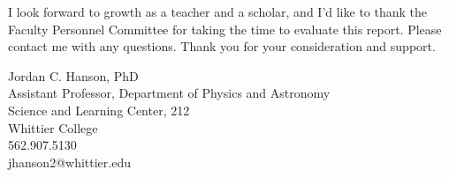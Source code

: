 \documentclass[../main.tex]{subfiles}
\begin{document}
I look forward to growth as a teacher and a scholar, and I'd like to thank the Faculty Personnel Committee for taking the time to evaluate this report.  Please contact me with any questions.  Thank you for your consideration and support. \\ \hspace{0.1cm}

Jordan C. Hanson, PhD \\
Assistant Professor, Department of Physics and Astronomy \\
Science and Learning Center, 212 \\
Whittier College \\
562.907.5130 \\
jhanson2@whittier.edu
\end{document}

